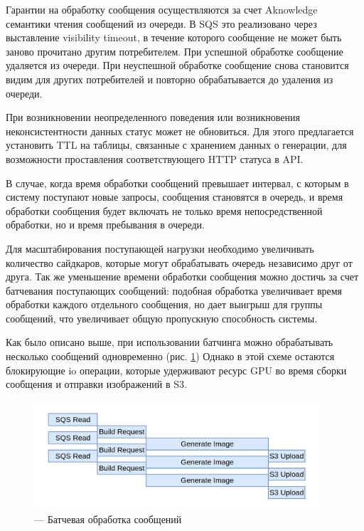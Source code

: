 Гарантии на обработку сообщения осуществляются за счет Aknowledge семантики чтения сообщений из очереди. 
В SQS это реализовано через выставление visibility timeout, в течение которого сообщение не может быть заново прочитано другим
потребителем. При успешной обработке сообщение удаляется из очереди. При неуспешной обработке сообщение снова становится 
видим для других потребителей и повторно обрабатывается до удаления из очереди.

При возникновении неопределенного поведения или возникновения неконсистентности данных статус может не обновиться.
Для этого предлагается установить TTL на таблицы, связанные с хранением данных о генерации, для 
возможности проставления соответствующего HTTP статуса в API.

В случае, когда время обработки сообщений превышает интервал, с которым в систему
поступают новые запросы, сообщения становятся в очередь, и время обработки сообщения будет 
включать не только время непосредственной обработки, но и время пребывания в очереди.

Для масштабирования поступающей нагрузки необходимо увеличивать количество сайдкаров, которые могут 
обрабатывать очередь независимо друг от друга. Так же уменьшение времени обработки сообщения можно 
достичь за счет батчевания поступающих сообщений: подобная обработка увеличивает время обработки 
каждого отдельного сообщения, но дает выигрыш для группы сообщений, что увеличивает общую
пропускную способность системы.

Как было описано выше, при использовании батчинга можно обрабатывать несколько сообщений одновременно (рис. \ref{fig:flame1})
Однако в этой схеме остаются блокирующие io операции, которые удерживают ресурс GPU во время сборки сообщения и отправки изображений
в S3. 

\begin{footnotesize}

\begin{figure}[H]
  \centering
  \includegraphics[width=0.95\textwidth]{img/flame1.jpg}
  \caption{--- Батчевая обработка сообщений}
    \label{fig:flame1}
\end{figure}
\end{footnotesize}

